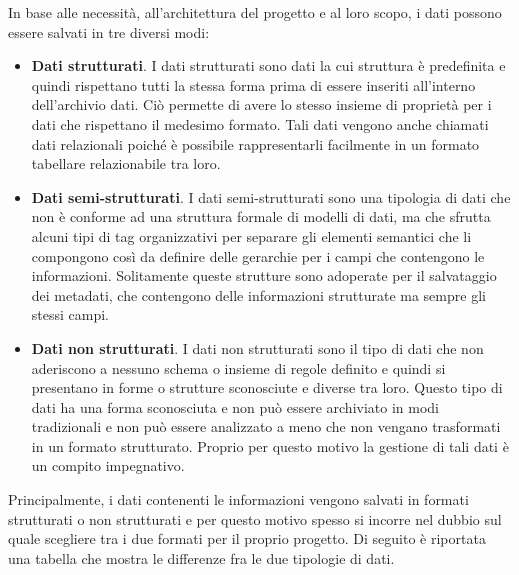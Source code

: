 In base alle necessità, all'architettura del progetto e al loro scopo, i dati possono essere salvati in tre diversi modi:

\begin{itemize}
    \item \textbf{Dati strutturati}. I dati strutturati sono dati la cui struttura è predefinita e quindi rispettano tutti la stessa forma prima di essere inseriti all'interno dell'archivio dati. Ciò permette di avere lo stesso insieme di proprietà per i dati che rispettano il medesimo formato. Tali dati vengono anche chiamati dati relazionali poiché è possibile rappresentarli facilmente in un formato tabellare relazionabile tra loro.\cite{geeksforgeeks_big_data_structure}
    \item \textbf{Dati semi-strutturati}. I dati semi-strutturati sono una tipologia di dati che non è conforme ad una struttura formale di modelli di dati, ma che sfrutta alcuni tipi di tag organizzativi per separare gli elementi semantici che li compongono così da definire delle gerarchie per i campi che contengono le informazioni. Solitamente queste strutture sono adoperate per il salvataggio dei metadati, che contengono delle informazioni strutturate ma sempre gli stessi campi.\cite{magnimind_big_data_structure}
    \item \textbf{Dati non strutturati}. I dati non strutturati sono il tipo di dati che non aderiscono a nessuno schema o insieme di regole definito e quindi si presentano in forme o strutture sconosciute e diverse tra loro. Questo tipo di dati ha una forma sconosciuta e non può essere archiviato in modi tradizionali e non può essere analizzato a meno che non vengano trasformati in un formato strutturato. Proprio per questo motivo la gestione di tali dati è un compito impegnativo.\cite{altervista_big_data_structure}
\end{itemize}

Principalmente, i dati contenenti le informazioni vengono salvati in formati strutturati o non strutturati e per questo motivo spesso si incorre nel dubbio sul quale scegliere tra i due formati per il proprio progetto. Di seguito è riportata una tabella che mostra le differenze fra le due tipologie di dati.\cite{analytixlabs_big_data_structure}

